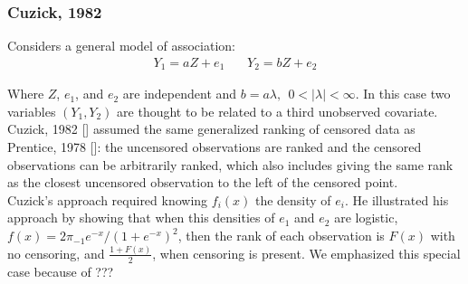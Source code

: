 \documentclass[]{article}
\begin{document}
\subsubsection{Cuzick, 1982}
Considers a general model of association:
	$$
	\begin{aligned}
		Y_1 = aZ + e_1 ~~~~~~~~ Y_2 = bZ + e_2
	\end{aligned}
	$$

Where $Z$, $e_1$, and $e_2$ are independent and  $b=a\lambda,~~0<|\lambda|<\infty$. In this case two variables $(Y_1, Y_2)$ are thought to be related to a third unobserved covariate.\\
Cuzick, 1982 [\cite{cuzick1982rank}] assumed the same generalized ranking of censored data as Prentice, 1978 [\cite{prentice1978linear}]: the uncensored observations are ranked and the censored observations can be arbitrarily ranked, which also includes giving the same rank as the closest uncensored observation to the left of the censored point.\\
Cuzick's approach required knowing $f_i(x)$ the density of $e_i$. He illustrated his approach by showing that when this densities of $e_1$ and $e_2$ are logistic, $f(x) = 2\pi_{-1} e^{-x}/(1+e^{-x})^2$, then the rank of each observation is $F(x)$ with no censoring, and $\frac{1+F(x)}{2}$, when censoring is present. We emphasized this special case because of ???
\end{document}
